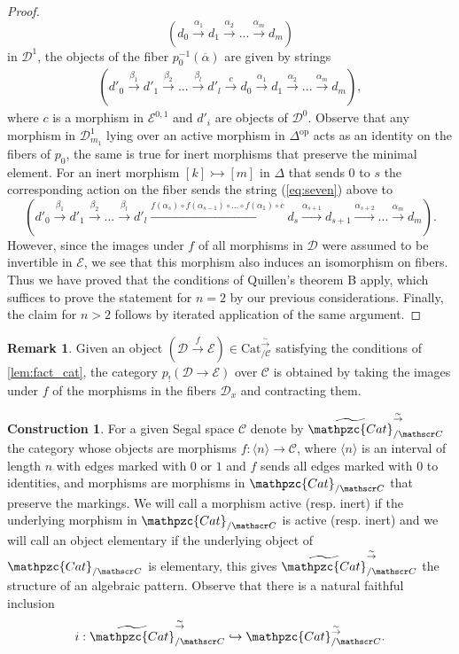 \documentclass[a4paper, reqno]{amsart}
\theoremstyle{definition}
\newtheorem{remark}[theorem]{Remark}
\newtheorem{construction}[theorem]{Construction}
\newcommand\cC{\mathscr C}
\newcommand\cD{\mathscr D}
\newcommand\cE{\mathscr E}
\newcommand\op{\mathrm{op}}
\newcommand\cat{\mathrm{Cat}}
\newcommand\ccat{\mathpzc{Cat}}
\newcommand\bn{\langle n\rangle}
\newcommand\wrr{{\overset{\sim}{\rightarrow}}}
\begin{document}
\begin{proof}
\[(d_0\xrightarrow{\alpha_1}d_1\xrightarrow{\alpha_2}...\xrightarrow{\alpha_m}d_m)\]
in $\cD^1$, the objects of the fiber $p_0^{-1}(\overline{\alpha})$ are given by strings 
\begin{align}\label{eq:seven}
(d'_0\xrightarrow{\beta_1}d'_1\xrightarrow{\beta_2}...\xrightarrow{\beta_l}d'_l\xrightarrow{c}d_0\xrightarrow{\alpha_1}d_1\xrightarrow{\alpha_2}...\xrightarrow{\alpha_m}d_m),
\end{align}
where $c$ is a morphism in $\cE^{0,1}$ and $d'_i$ are objects of $\cD^0$. Observe that any morphism in $\cD^1_{m_1}$ lying over an active morphism in $\Delta^\op$ acts as an identity on the fibers of $p_0$, the same is true for inert morphisms that preserve the minimal element. For an inert morphism $[k]\rightarrowtail[m]$ in $\Delta$ that sends $0$ to $s$ the corresponding action on the fiber sends the string (\ref{eq:seven}) above to 
\[(d'_0\xrightarrow{\beta_1}d'_1\xrightarrow{\beta_2}...\xrightarrow{\beta_l}d'_l\xrightarrow{f(\alpha_s)\circ f(\alpha_{s-1})\circ...\circ f(\alpha_1)\circ c}d_s\xrightarrow{\alpha_{s+1}}d_{s+1}\xrightarrow{\alpha_{s+2}}...\xrightarrow{\alpha_m}d_m).\]
However, since the images under $f$ of all morphisms in $\cD$ were assumed to be invertible in $\cE$, we see that this morphism also induces an isomorphism on fibers. Thus we have proved that the conditions of Quillen's theorem B apply, which suffices to prove the statement for $n=2$ by our previous considerations. Finally, the claim for $n>2$ follows by iterated application of the same argument.
\end{proof}
\begin{remark}\label{rem:fact_cat}
Given an object $(\cD\xrightarrow{f}\cE)\in\cat^\wrr_{/\cC}$ satisfying the conditions of \cref{lem:fact_cat}, the category $p_!(\cD\rightarrow\cE)$ over $\cC$ is obtained by taking the images under $f$ of the morphisms in the fibers $\cD_x$ and contracting them.
\end{remark}
\begin{construction}\label{constr:free_cat}
For a given Segal space $\cC$ denote by $\widetilde{\ccat}^\wrr_{/\cC}$ the category whose objects are morphisms $f:\bn\rightarrow\cC$, where $\bn$ is an interval of length $n$ with edges marked with $0$ or $1$ and $f$ sends all edges marked with $0$ to identities, and morphisms are morphisms in $\ccat_{/\cC}$ that preserve the markings. We will call a morphism active (resp. inert) if the underlying morphism in $\ccat_{/\cC}$ is active (resp. inert) and we will call an object elementary if the underlying object of $\ccat_{/\cC}$ is elementary, this gives $\widetilde{\ccat}^\wrr_{/\cC}$ the structure of an algebraic pattern. Observe that there is a natural faithful inclusion \[i:\widetilde{\ccat}^\wrr_{/\cC}\hookrightarrow\ccat^\wrr_{/\cC}.\]
\end{construction}
\end{document}
